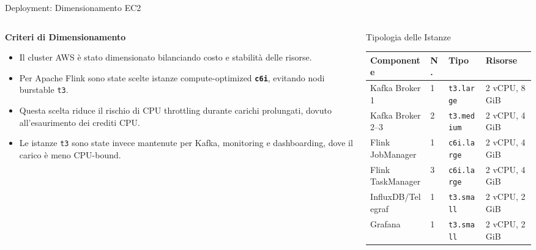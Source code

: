 \documentclass[10pt, aspectratio=169]{beamer}
\begin{document}
\begin{frame}{Deployment: Dimensionamento EC2}
    \begin{columns}[c]

        \begin{column}{0.50\textwidth}
            \textbf{Criteri di Dimensionamento}

            \begin{itemize}
                \item Il cluster AWS è stato dimensionato bilanciando costo e stabilità delle risorse.
                \item Per Apache Flink sono state scelte istanze compute-optimized \textbf{\texttt{c6i}}, evitando nodi burstable \texttt{t3}.
                \item Questa scelta riduce il rischio di CPU throttling durante carichi prolungati, dovuto all'esaurimento dei crediti CPU.
                \item Le istanze \texttt{t3} sono state invece mantenute per Kafka, monitoring e dashboarding, dove il carico è meno CPU-bound.
            \end{itemize}
        \end{column}

        \begin{column}{0.48\textwidth}
            \begin{block}{\scriptsize Tipologia delle Istanze}
                \centering
                \scriptsize
                \begin{tabular}{llll}
                    \hline
                    \textbf{Componente} & \textbf{N.} & \textbf{Tipo} & \textbf{Risorse} \\
                    \hline
                    Kafka Broker 1 & 1 & \texttt{t3.large} & 2 vCPU, 8 GiB \\
                    Kafka Broker 2--3 & 2 & \texttt{t3.medium} & 2 vCPU, 4 GiB \\
                    Flink JobManager & 1 & \texttt{c6i.large} & 2 vCPU, 4 GiB \\
                    Flink TaskManager & 3 & \texttt{c6i.large} & 2 vCPU, 4 GiB \\
                    InfluxDB/Telegraf & 1 & \texttt{t3.small} & 2 vCPU, 2 GiB \\
                    Grafana & 1 & \texttt{t3.small} & 2 vCPU, 2 GiB \\
                    \hline
                \end{tabular}
            \end{block}
        \end{column}

    \end{columns}
\end{frame}
\end{document}
